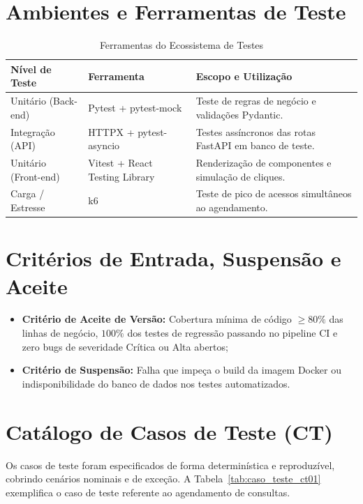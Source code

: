 \section{Ambientes e Ferramentas de Teste}
\begin{table}[htbp]
\caption{Ferramentas do Ecossistema de Testes}
\label{tab:ferramentas_teste}
\centering
\small
\begin{tabularx}{\textwidth}{@{} l l Y @{}}
\toprule
\textbf{Nível de Teste} & \textbf{Ferramenta} & \textbf{Escopo e Utilização} \\
\midrule
Unitário (Back-end) & Pytest + pytest-mock & Teste de regras de negócio e validações Pydantic. \\
Integração (API) & HTTPX + pytest-asyncio & Testes assíncronos das rotas FastAPI em banco de teste. \\
Unitário (Front-end) & Vitest + React Testing Library & Renderização de componentes e simulação de cliques. \\
Carga / Estresse & k6 & Teste de pico de acessos simultâneos ao agendamento. \\
\bottomrule
\end{tabularx}
\end{table}

\section{Critérios de Entrada, Suspensão e Aceite}
\begin{itemize}
    \item \textbf{Critério de Aceite de Versão:} Cobertura mínima de código $\ge 80\%$ das linhas de negócio, $100\%$ dos testes de regressão passando no pipeline CI e zero bugs de severidade Crítica ou Alta abertos;
    \item \textbf{Critério de Suspensão:} Falha que impeça o build da imagem Docker ou indisponibilidade do banco de dados nos testes automatizados.
\end{itemize}

\section{Catálogo de Casos de Teste (CT)}
Os casos de teste foram especificados de forma determinística e reproduzível, cobrindo cenários nominais e de exceção. A Tabela~\ref{tab:caso_teste_ct01} exemplifica o caso de teste referente ao agendamento de consultas.

